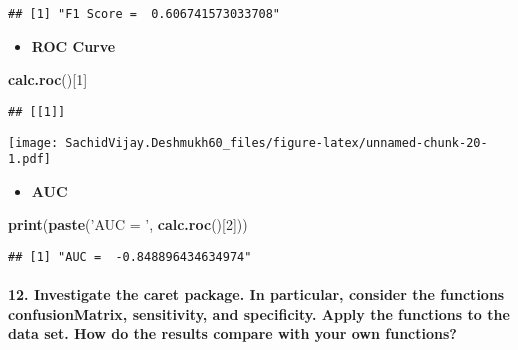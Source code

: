 \documentclass[]{article}
\newenvironment{Shaded}{\begin{snugshade}}{\end{snugshade}}
\newcommand{\DecValTok}[1]{\textcolor[rgb]{0.00,0.00,0.81}{#1}}
\newcommand{\KeywordTok}[1]{\textcolor[rgb]{0.13,0.29,0.53}{\textbf{#1}}}
\newcommand{\NormalTok}[1]{#1}
\newcommand{\StringTok}[1]{\textcolor[rgb]{0.31,0.60,0.02}{#1}}
\providecommand{\tightlist}{%
  \setlength{\itemsep}{0pt}\setlength{\parskip}{0pt}}
\let\oldparagraph\paragraph
\renewcommand{\paragraph}[1]{\oldparagraph{#1}\mbox{}}
\begin{document}
\begin{verbatim}
## [1] "F1 Score =  0.606741573033708"
\end{verbatim}

\begin{itemize}
\tightlist
\item
  \textbf{ROC Curve}
\end{itemize}

\begin{Shaded}
\begin{Highlighting}[]
\KeywordTok{calc.roc}\NormalTok{()[}\DecValTok{1}\NormalTok{]}
\end{Highlighting}
\end{Shaded}

\begin{verbatim}
## [[1]]
\end{verbatim}

\texttt{[image: SachidVijay.Deshmukh60\_files/figure-latex/unnamed-chunk-20-1.pdf]}

\begin{itemize}
\tightlist
\item
  \textbf{AUC}
\end{itemize}

\begin{Shaded}
\begin{Highlighting}[]
\KeywordTok{print}\NormalTok{(}\KeywordTok{paste}\NormalTok{(}\StringTok{'AUC = '}\NormalTok{, }\KeywordTok{calc.roc}\NormalTok{()[}\DecValTok{2}\NormalTok{]))}
\end{Highlighting}
\end{Shaded}

\begin{verbatim}
## [1] "AUC =  -0.848896434634974"
\end{verbatim}

\hypertarget{investigate-the-caret-package.-in-particular-consider-the-functions-confusionmatrix-sensitivity-and-specificity.-apply-the-functions-to-the-data-set.-how-do-the-results-compare-with-your-own-functions}{%
\paragraph{12. Investigate the caret package. In particular, consider
the functions confusionMatrix, sensitivity, and specificity. Apply the
functions to the data set. How do the results compare with your own
functions?}\label{investigate-the-caret-package.-in-particular-consider-the-functions-confusionmatrix-sensitivity-and-specificity.-apply-the-functions-to-the-data-set.-how-do-the-results-compare-with-your-own-functions}}
\end{document}
